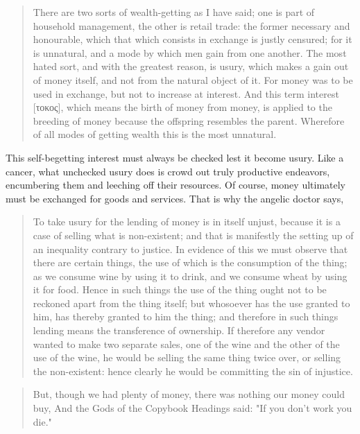 \documentclass[letterpaper]{article}
\begin{document}
\begin{quote}
  There are two sorts of wealth-getting as I have said; one is part of household management, the other is retail trade: the former necessary and honourable, which that which consists in exchange is justly censured; for it is unnatural, and a mode by which men gain from one another. The most hated sort, and with the greatest reason, is usury, which makes a gain out of money itself, and not from the natural object of it. For money was to be used in exchange, but not to increase at interest. And this term interest [τοκος], which means the birth of money from money, is applied to the breeding of money because the offspring resembles the parent. Wherefore of all modes of getting wealth this is the most unnatural.
\end{quote}

This self-begetting interest must always be checked lest it become usury. Like a cancer, what unchecked usury does is crowd out truly productive endeavors, encumbering them and leeching off their resources. Of course, money ultimately must be exchanged for goods and services. That is why the angelic doctor says,

\begin{quote}
  To take usury for the lending of money is in itself unjust, because it is a case of selling what is non-existent; and that is manifestly the setting up of an inequality contrary to justice. In evidence of this we must observe that there are certain things, the use of which is the consumption of the thing; as we consume wine by using it to drink, and we consume wheat by using it for food. Hence in such things the use of the thing ought not to be reckoned apart from the thing itself; but whosoever has the use granted to him, has thereby granted to him the thing; and therefore in such things lending means the transference of ownership. If therefore any vendor wanted to make two separate sales, one of the wine and the other of the use of the wine, he would be selling the same thing twice over, or selling the non-existent: hence clearly he would be committing the sin of injustice.
\end{quote}

\begin{quote}
  But, though we had plenty of money, there was nothing our money could buy,
  And the Gods of the Copybook Headings said: "If you don't work you die."
\end{quote}
\end{document}
